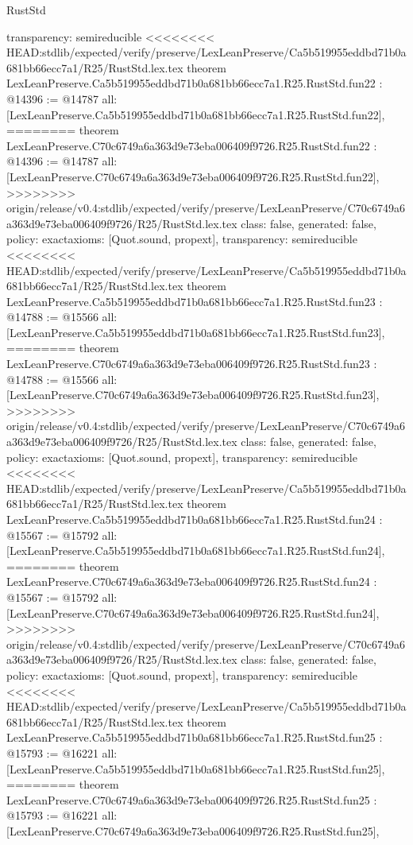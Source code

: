 \begin{lexlean}{RustStd}
\begin{coremodule}
{\begin{coremodule}
{{{{{{{{{{{{{{{{{{{{{{{{{  transparency: semireducible
}
<<<<<<<< HEAD:stdlib/expected/verify/preserve/LexLeanPreserve/Ca5b519955eddbd71b0a681bb66ecc7a1/R25/RustStd.lex.tex
theorem LexLeanPreserve.Ca5b519955eddbd71b0a681bb66ecc7a1.R25.RustStd.fun22 : @14396 := @14787 {
  all: [LexLeanPreserve.Ca5b519955eddbd71b0a681bb66ecc7a1.R25.RustStd.fun22],
========
theorem LexLeanPreserve.C70c6749a6a363d9e73eba006409f9726.R25.RustStd.fun22 : @14396 := @14787 {
  all: [LexLeanPreserve.C70c6749a6a363d9e73eba006409f9726.R25.RustStd.fun22],
>>>>>>>> origin/release/v0.4:stdlib/expected/verify/preserve/LexLeanPreserve/C70c6749a6a363d9e73eba006409f9726/R25/RustStd.lex.tex
  class: false,
  generated: false,
  policy: exact{axioms: [Quot.sound, propext]},
  transparency: semireducible
}
<<<<<<<< HEAD:stdlib/expected/verify/preserve/LexLeanPreserve/Ca5b519955eddbd71b0a681bb66ecc7a1/R25/RustStd.lex.tex
theorem LexLeanPreserve.Ca5b519955eddbd71b0a681bb66ecc7a1.R25.RustStd.fun23 : @14788 := @15566 {
  all: [LexLeanPreserve.Ca5b519955eddbd71b0a681bb66ecc7a1.R25.RustStd.fun23],
========
theorem LexLeanPreserve.C70c6749a6a363d9e73eba006409f9726.R25.RustStd.fun23 : @14788 := @15566 {
  all: [LexLeanPreserve.C70c6749a6a363d9e73eba006409f9726.R25.RustStd.fun23],
>>>>>>>> origin/release/v0.4:stdlib/expected/verify/preserve/LexLeanPreserve/C70c6749a6a363d9e73eba006409f9726/R25/RustStd.lex.tex
  class: false,
  generated: false,
  policy: exact{axioms: [Quot.sound, propext]},
  transparency: semireducible
}
<<<<<<<< HEAD:stdlib/expected/verify/preserve/LexLeanPreserve/Ca5b519955eddbd71b0a681bb66ecc7a1/R25/RustStd.lex.tex
theorem LexLeanPreserve.Ca5b519955eddbd71b0a681bb66ecc7a1.R25.RustStd.fun24 : @15567 := @15792 {
  all: [LexLeanPreserve.Ca5b519955eddbd71b0a681bb66ecc7a1.R25.RustStd.fun24],
========
theorem LexLeanPreserve.C70c6749a6a363d9e73eba006409f9726.R25.RustStd.fun24 : @15567 := @15792 {
  all: [LexLeanPreserve.C70c6749a6a363d9e73eba006409f9726.R25.RustStd.fun24],
>>>>>>>> origin/release/v0.4:stdlib/expected/verify/preserve/LexLeanPreserve/C70c6749a6a363d9e73eba006409f9726/R25/RustStd.lex.tex
  class: false,
  generated: false,
  policy: exact{axioms: [Quot.sound, propext]},
  transparency: semireducible
}
<<<<<<<< HEAD:stdlib/expected/verify/preserve/LexLeanPreserve/Ca5b519955eddbd71b0a681bb66ecc7a1/R25/RustStd.lex.tex
theorem LexLeanPreserve.Ca5b519955eddbd71b0a681bb66ecc7a1.R25.RustStd.fun25 : @15793 := @16221 {
  all: [LexLeanPreserve.Ca5b519955eddbd71b0a681bb66ecc7a1.R25.RustStd.fun25],
========
theorem LexLeanPreserve.C70c6749a6a363d9e73eba006409f9726.R25.RustStd.fun25 : @15793 := @16221 {
  all: [LexLeanPreserve.C70c6749a6a363d9e73eba006409f9726.R25.RustStd.fun25],
}}}}}}}}}}}}}}}}}}}}}}}}}}}}}
\end{coremodule}}
\end{coremodule}
\end{lexlean}
